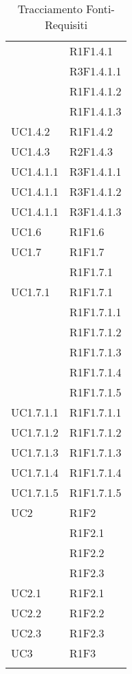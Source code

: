 \begin{longtable}{|>{\centering}m{5cm}|m{5cm}<{\centering}|}
{UC1.4.1}&{R1F1.4.1}\\
&{R3F1.4.1.1}\\
&{R1F1.4.1.2}\\
&{R1F1.4.1.3}\\ \hline
{UC1.4.2}&{R1F1.4.2}\\ \hline
{UC1.4.3}&{R2F1.4.3}\\ \hline
{UC1.4.1.1}&{R3F1.4.1.1}\\ \hline
{UC1.4.1.1}&{R3F1.4.1.2}\\ \hline
{UC1.4.1.1}&{R3F1.4.1.3}\\ \hline
{UC1.6}&{R1F1.6}\\ \hline
{UC1.7}&{R1F1.7}\\
&{R1F1.7.1}\\ \hline
{UC1.7.1}&{R1F1.7.1}\\
&{R1F1.7.1.1}\\
&{R1F1.7.1.2}\\
&{R1F1.7.1.3}\\
&{R1F1.7.1.4}\\
&{R1F1.7.1.5}\\ \hline
{UC1.7.1.1}&{R1F1.7.1.1}\\ \hline
{UC1.7.1.2}&{R1F1.7.1.2}\\ \hline
{UC1.7.1.3}&{R1F1.7.1.3}\\ \hline
{UC1.7.1.4}&{R1F1.7.1.4}\\ \hline
{UC1.7.1.5}&{R1F1.7.1.5}\\ \hline


{UC2}&{R1F2}\\
&{R1F2.1}\\
&{R1F2.2}\\
&{R1F2.3}\\ \hline
{UC2.1}&{R1F2.1}\\ \hline
{UC2.2}&{R1F2.2}\\ \hline
{UC2.3}&{R1F2.3}\\ \hline

{UC3}&{R1F3}\\ \hline

\caption[Tracciamento Fonti-Requisiti]{Tracciamento Fonti-Requisiti}
\label{tabella: Tracciamento Fonti-Requisiti}
\end{longtable}


